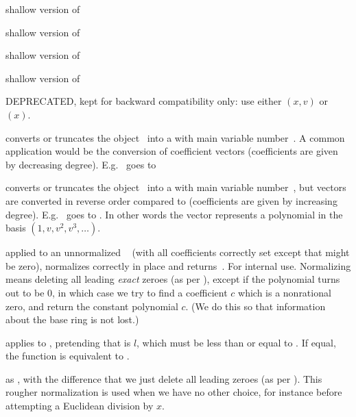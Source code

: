  shallow version of 

 shallow version of 

 shallow version of 

 shallow version of 

 DEPRECATED, kept for backward
compatibility only: use either $(x,v)$ or $(x)$.


 converts or truncates the object~
into a  with main variable number~. A common application
would be the conversion of coefficient vectors (coefficients are given by
decreasing degree). E.g.~\kbd{[2,3]} goes to 

 converts or truncates the object~
into a  with main variable number~, but vectors are converted
in reverse order compared to  (coefficients are given by
increasing degree). E.g.~\kbd{[2,3]} goes to . In other words
the vector represents a polynomial in the basis $(1,v,v^2,v^3,\dots)$.

 applied to an unnormalized ~
(with all coefficients correctly set except that  might
be zero), normalizes  correctly in place and returns~. For
internal use. Normalizing means deleting all leading \emph{exact} zeroes
(as per ), except if the polynomial turns out to be $0$,
in which case we try to find a coefficient $c$ which is a nonrational zero,
and return the constant polynomial $c$. (We do this so that information
about the base ring is not lost.)

 applies  to
, pretending that  is $l$, which must be less than
or equal to . If equal, the function is equivalent to
.

 as ,
with the difference that we just delete all leading zeroes (as per
). This rougher normalization is used when we have no other
choice, for instance before attempting a Euclidean division by $x$.

